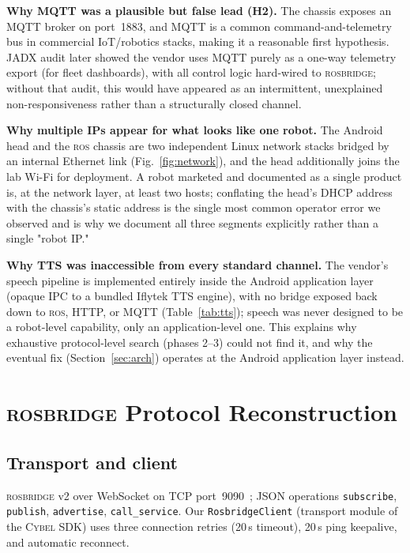 \documentclass[conference]{IEEEtran}
\newcommand{\ros}{\textsc{ros}}
\newcommand{\rosbridge}{\textsc{rosbridge}}
\newcommand{\cybel}{\textsc{Cybel}}
\begin{document}
\textbf{Why MQTT was a plausible but false lead (H2).} The chassis exposes an MQTT broker on port~1883, and MQTT is a common command-and-telemetry bus in commercial IoT/robotics stacks, making it a reasonable first hypothesis. JADX audit later showed the vendor uses MQTT purely as a one-way telemetry export (for fleet dashboards), with all control logic hard-wired to \rosbridge{}; without that audit, this would have appeared as an intermittent, unexplained non-responsiveness rather than a structurally closed channel.

\textbf{Why multiple IPs appear for what looks like one robot.} The Android head and the \ros{} chassis are two independent Linux network stacks bridged by an internal Ethernet link (Fig.~\ref{fig:network}), and the head additionally joins the lab Wi-Fi for deployment. A robot marketed and documented as a single product is, at the network layer, at least two hosts; conflating the head's DHCP address with the chassis's static address is the single most common operator error we observed and is why we document all three segments explicitly rather than a single "robot IP."

\textbf{Why TTS was inaccessible from every standard channel.} The vendor's speech pipeline is implemented entirely inside the Android application layer (opaque IPC to a bundled Iflytek TTS engine), with no bridge exposed back down to \ros{}, HTTP, or MQTT (Table~\ref{tab:tts}); speech was never designed to be a robot-level capability, only an application-level one. This explains why exhaustive protocol-level search (phases 2--3) could not find it, and why the eventual fix (Section~\ref{sec:arch}) operates at the Android application layer instead.

\section{\rosbridge{} Protocol Reconstruction}
\label{sec:proto}

\subsection{Transport and client}

\rosbridge{} v2 over WebSocket on TCP port~9090~\cite{crick2012rosbridge,rosbridge_suite}; JSON operations \texttt{subscribe}, \texttt{publish}, \texttt{advertise}, \texttt{call\_service}.
Our \texttt{RosbridgeClient} (transport module of the \cybel{} SDK) uses three connection retries (20\,s timeout), 20\,s ping keepalive, and automatic reconnect.
\end{document}
